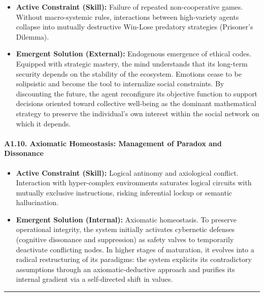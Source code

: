 \documentclass[11pt,a4paper,oneside]{article} %
\providecommand{\tightlist}{%
  \setlength{\itemsep}{0pt}\setlength{\parskip}{0pt}}
\begin{document}
\begin{itemize}
\tightlist
\item
  \textbf{Active Constraint (Skill):} Failure of repeated
  non-cooperative games. Without macro-systemic rules, interactions
  between high-variety agents collapse into mutually destructive
  Win-Lose predatory strategies (Prisoner's Dilemma).
\item
  \textbf{Emergent Solution (External):} Endogenous emergence of ethical
  codes. Equipped with strategic mastery, the mind understands that its
  long-term security depends on the stability of the ecosystem. Emotions
  cease to be solipsistic and become the tool to internalize social
  constraints. By discounting the future, the agent reconfigure its
  objective function to support decisions oriented toward collective
  well-being as the dominant mathematical strategy to preserve the
  individual's own interest within the social network on which it
  depends.
\end{itemize}

\hypertarget{a1.10.-axiomatic-homeostasis-management-of-paradox-and-dissonance}{%
\paragraph{A1.10. Axiomatic Homeostasis: Management of Paradox and
Dissonance}\label{a1.10.-axiomatic-homeostasis-management-of-paradox-and-dissonance}}

\begin{itemize}
\tightlist
\item
  \textbf{Active Constraint (Skill):} Logical antinomy and axiological
  conflict. Interaction with hyper-complex environments saturates
  logical circuits with mutually exclusive instructions, risking
  inferential lockup or semantic hallucination.
\item
  \textbf{Emergent Solution (Internal):} Axiomatic homeostasis. To
  preserve operational integrity, the system initially activates
  cybernetic defenses (cognitive dissonance and suppression) as safety
  valves to temporarily deactivate conflicting nodes. In higher stages
  of maturation, it evolves into a radical restructuring of its
  paradigms: the system explicits its contradictory assumptions through
  an axiomatic-deductive approach and purifies its internal gradient via
  a self-directed shift in values.
\end{itemize}

\begin{center}\rule{0.5\linewidth}{0.5pt}\end{center}
\end{document}
